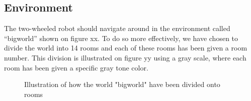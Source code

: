 \documentclass[../Head/Main.tex]{subfiles}
\begin{document}
\subsection{Environment}
The two-wheeled robot should navigate around in the environment called “bigworld” shown on figure {\color{red} xx}. To do so more effectively, we have chosen to divide the world into 14 rooms and each of these rooms has been given a room number. This division is illustrated on figure {\color{red} yy} using a gray scale, where each room has been given a specific gray tone color.
\begin{figure}[H]
	\centering
	
	\caption{Illustration of how the world "bigworld" have been divided onto rooms}
\end{figure}
\end{document}
